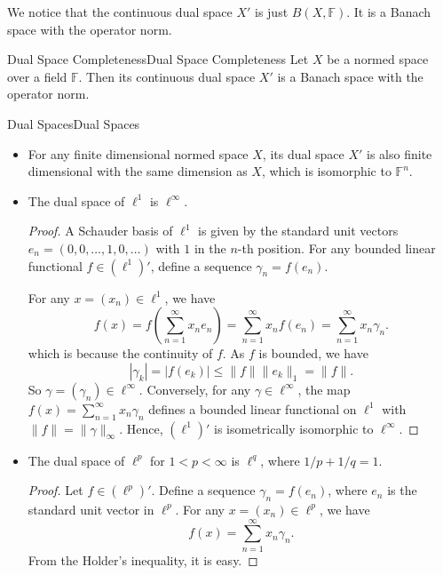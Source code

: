 \documentclass[../main.tex]{subfiles}
\begin{document}
We notice that the continuous dual space $X'$ is just $B(X, \mathbb{F})$. It is a Banach space with the operator norm.

\begin{theorem}{Dual Space Completeness}{Dual Space Completeness}
	Let $X$ be a normed space over a field $\mathbb{F}$. Then its continuous dual space $X'$ is a Banach space with the operator norm.
\end{theorem}

\begin{example}{Dual Spaces}{Dual Spaces}
	\begin{itemize}
		\item For any finite dimensional normed space $X$, its dual space $X'$ is also finite dimensional with the same dimension as $X$, which is isomorphic to $\mathbb{F}^n$.
		\item The dual space of $\ell^1$ is $\ell^\infty$.
			\begin{proof}
			A Schauder basis of $\ell^1$ is given by the standard unit vectors $e_n = (0, 0, \ldots, 1, 0, \ldots)$ with $1$ in the $n$-th position. For any bounded linear functional $f \in (\ell^1)'$, define a sequence $\gamma_n = f(e_n)$.

			For any $x = (x_n) \in \ell^1$, we have
			\begin{equation*}
				f(x) = f\left(\sum_{n=1}^\infty x_n e_n\right) = \sum_{n=1}^\infty x_n f(e_n) = \sum_{n=1}^\infty x_n \gamma_n.
			\end{equation*}
			which is because the continuity of $f$. As $f$ is bounded, we have
			\begin{equation*}
				|\gamma_k| = |f(e_k)| \leq \|f\| \|e_k\|_1 = \|f\|.
			\end{equation*}
			So $\gamma = (\gamma_n) \in \ell^\infty$. Conversely, for any $\gamma \in \ell^\infty$, the map $f(x) = \sum_{n=1}^\infty x_n \gamma_n$ defines a bounded linear functional on $\ell^1$ with $\|f\| = \|\gamma\|_\infty$. Hence, $(\ell^1)'$ is isometrically isomorphic to $\ell^\infty$.
			\end{proof}
		\item The dual space of $\ell^p$ for $1 < p < \infty$ is $\ell^q$, where $1/p + 1/q = 1$.
			\begin{proof}
			Let $f \in (\ell^p)'$. Define a sequence $\gamma_n = f(e_n)$, where $e_n$ is the standard unit vector in $\ell^p$. For any $x = (x_n) \in \ell^p$, we have
			\begin{equation*}
				f(x) = \sum_{n=1}^\infty x_n \gamma_n.
			\end{equation*}
			From the Holder's inequality, it is easy.
			\end{proof}
	\end{itemize}
\end{example}
\end{document}

